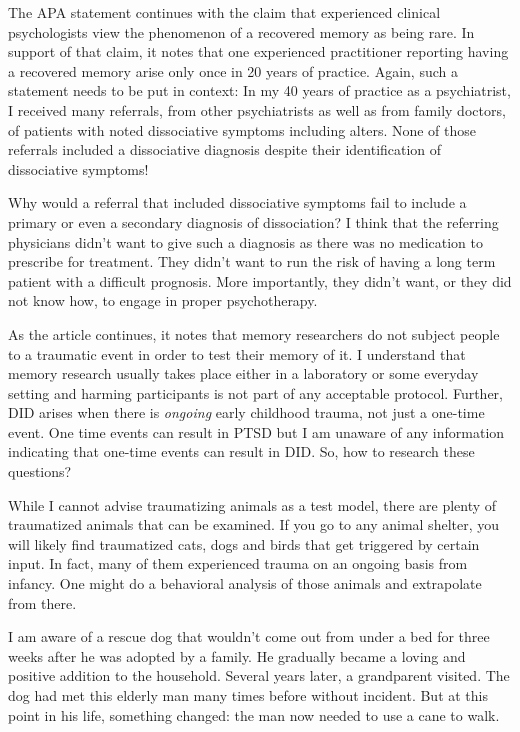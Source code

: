 \documentclass[]{book}
\begin{document}
The APA statement continues with the claim that experienced clinical psychologists view the phenomenon of a recovered memory as being rare. In support of that claim, it notes that one experienced practitioner reporting having a recovered memory arise only once in 20 years of practice. Again, such a statement needs to be put in context: In my 40 years of practice as a psychiatrist, I received many referrals, from other psychiatrists as well as from family doctors, of patients with noted dissociative symptoms including alters. None of those referrals included a dissociative diagnosis despite their identification of dissociative symptoms!

Why would a referral that included dissociative symptoms fail to include a primary or even a secondary diagnosis of dissociation? I think that the referring physicians didn't want to give such a diagnosis as there was no medication to prescribe for treatment. They didn't want to run the risk of having a long term patient with a difficult prognosis. More importantly, they didn't want, or they did not know how, to engage in proper psychotherapy.

As the article continues, it notes that memory researchers do not subject people to a traumatic event in order to test their memory of it. I understand that memory research usually takes place either in a laboratory or some everyday setting and harming participants is not part of any acceptable protocol. Further, DID arises when there is \emph{ongoing} early childhood trauma, not just a one-time event. One time events can result in PTSD but I am unaware of any information indicating that one-time events can result in DID. So, how to research these questions?

While I cannot advise traumatizing animals as a test model, there are plenty of traumatized animals that can be examined. If you go to any animal shelter, you will likely find traumatized cats, dogs and birds that get triggered by certain input. In fact, many of them experienced trauma on an ongoing basis from infancy. One might do a behavioral analysis of those animals and extrapolate from there.

I am aware of a rescue dog that wouldn't come out from under a bed for three weeks after he was adopted by a family. He gradually became a loving and positive addition to the household. Several years later, a grandparent visited. The dog had met this elderly man many times before without incident. But at this point in his life, something changed: the man now needed to use a cane to walk.
\end{document}
